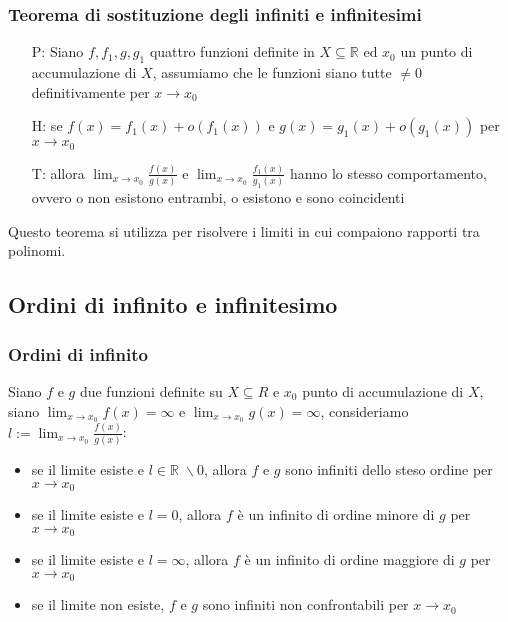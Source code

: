 \documentclass[a4paper]{article}
\begin{document}
\subsubsection*{Teorema di sostituzione degli infiniti e infinitesimi}
\begin{itemize}
	\item[P:] Siano \(f, f_1, g, g_1\) quattro funzioni definite in \(X \subseteq \mathbb{R}\) ed \(x_0\) un punto di accumulazione di \(X\),
	assumiamo che le funzioni siano tutte \(\neq 0\) definitivamente per \(x \to x_0\)
	\item[H:] se \(f(x) = f_1(x) + o(f_1(x))\) e \(g(x) = g_1(x) + o(g_1(x))\) per \(x \to x_0\)
	\item[T:] allora \(\displaystyle \lim_{x \to x_0} \frac{f(x)}{g(x)}\) e \(\displaystyle \lim_{x \to x_0} \frac{f_1(x)}{g_1(x)}\) hanno lo stesso comportamento,
	ovvero o non esistono entrambi, o esistono e sono coincidenti
\end{itemize}
Questo teorema si utilizza per risolvere i limiti in cui compaiono rapporti tra polinomi.

\subsection{Ordini di infinito e infinitesimo}
\subsubsection*{Ordini di infinito}
Siano \(f\) e \(g\) due funzioni definite su \(X \subseteq R\) e \(x_0\) punto di accumulazione di \(X\), siano \(\displaystyle \lim_{x \to x_0} f(x) = \infty\)
e \(\displaystyle \lim_{x \to x_0} g(x) = \infty\), consideriamo \(\displaystyle l := \lim_{x \to x_0} \frac{f(x)}{g(x)}\):
\begin{itemize}
	\item se il limite esiste e \(l \in \mathbb{R} \; \backslash 0\), allora \(f\) e \(g\) sono infiniti dello steso ordine per \(x \to x_0\)
	\item se il limite esiste e \(l = 0\), allora \(f\) è un infinito di ordine minore di \(g\) per \(x \to x_0\)
	\item se il limite esiste e \(l = \infty\), allora \(f\) è un infinito di ordine maggiore di \(g\) per \(x \to x_0\)
	\item se il limite non esiste, \(f\) e \(g\) sono infiniti non confrontabili per \(x \to x_0\)
\end{itemize}
\end{document}
